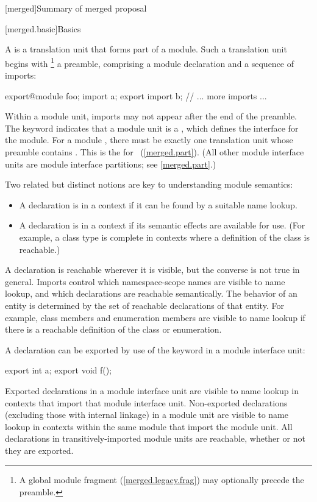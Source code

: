 [merged]{Summary of merged proposal}

[merged.basic]{Basics}

\pnum
A  is a translation unit that forms part of a module.
Such a translation unit begins with%
\footnote{A global module fragment (\ref{merged.legacy.frag}) may optionally
precede the preamble.}
a preamble,
comprising a module declaration
and a sequence of imports:

\begin{codeblock}
export@\opt@ module foo;
import a;
export import b;
// ... more imports ...
\end{codeblock}

Within a module unit, imports may not appear after the end of the preamble.
The  keyword indicates that a module unit is a
, which defines the interface for the module.
For a module , there must be exactly one
translation unit whose preamble contains .
This is the 
for ~(\ref{merged.part}).
(All other module interface units are module interface partitions;
see \ref{merged.part}.)

\pnum
Two related but distinct notions are key to understanding module semantics:
\begin{itemize}
\item A declaration is  in a context if it can be found by a
suitable name lookup.
\item A declaration is  in a context if its semantic effects
are available for use. (For example, a class type is complete in contexts
where a definition of the class is reachable.)
\end{itemize}
A declaration is reachable wherever it is visible, but the converse is not true
in general.
Imports control which namespace-scope names are visible to name lookup,
and which declarations are reachable semantically.
The behavior of an entity is determined by
the set of reachable declarations of that entity.
For example, class members and enumeration members are visible to name lookup
if there is a reachable definition of the class or enumeration.
 
\pnum
A declaration can be exported by use of the  keyword
in a module interface unit:
\begin{codeblock}
export int a;
export {
void f();
}
\end{codeblock}
Exported declarations in a module interface unit
are visible to name lookup
in contexts that import that module interface unit.
Non-exported declarations (excluding those with internal linkage)
in a module unit
are visible to name lookup
in contexts within the same module that import the module unit.
All declarations in transitively-imported module units
are reachable, whether or not they are exported.

